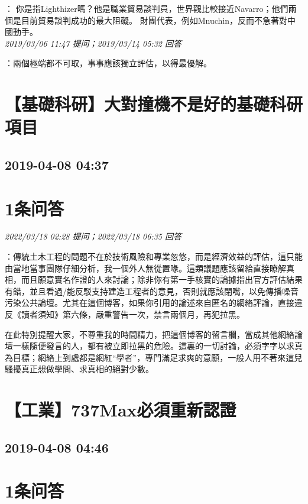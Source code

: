 \documentclass[twocolumn]{ctexart}
\begin{document}
：
你是指Lighthizer嗎？他是職業貿易談判員，世界觀比較接近Navarro；他們兩個是目前貿易談判成功的最大阻礙。
財團代表，例如Mnuchin，反而不急著對中國動手。
\\

\textit{\hfill\noindent\small 2019/03/06 11:47 提问；2019/03/14 05:32 回答}

：兩個極端都不可取，事事應該獨立評估，以得最優解。
\\


\section{【基礎科研】大對撞機不是好的基礎科研項目}
\subsection{2019-04-08 04:37}


\section{1条问答}

\textit{\hfill\noindent\small 2022/03/18 02:28 提问；2022/03/18 06:35 回答}

：傳統土木工程的問題不在於技術風險和專業忽悠，而是經濟效益的評估，這只能由當地當事團隊仔細分析，我一個外人無從置喙。這類議題應該留給直接瞭解真相，而且願意實名作證的人來討論；除非你有第一手核實的論據指出官方評估結果有錯，並且看過/能反駁支持建造工程者的意見，否則就應該閉嘴，以免傳播噪音污染公共論壇。尤其在這個博客，如果你引用的論述來自匿名的網絡評論，直接違反《讀者須知》第六條，嚴重警告一次，禁言兩個月，再犯拉黑。


在此特別提醒大家，不尊重我的時間精力，把這個博客的留言欄，當成其他網絡論壇一樣隨便發言的人，都有被立即拉黑的危險。這裏的一切討論，必須字字以求真為目標；網絡上到處都是網紅“學者”，專門滿足求爽的意願，一般人用不著來這兒騷擾真正想做學問、求真相的絕對少數。
\\


\section{【工業】737Max必須重新認證}
\subsection{2019-04-08 04:46}


\section{1条问答}
\end{document}
